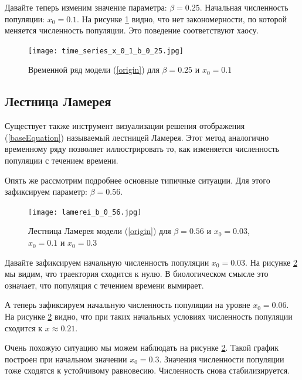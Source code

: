         Давайте теперь изменим значение параметра: \(\beta = 0.25\). Начальная численность популяции: \(x_0 = 0.1\). На рисунке \ref{time_series_x_0_1_b_0_25} видно, что нет закономерности, по которой меняется численность популяции. Это поведение соответствуют хаосу.
    
        \begin{figure}
            \centering
            \texttt{[image: time\_series\_x\_0\_1\_b\_0\_25.jpg]}

            \captionsetup{justification=centering}
            \caption{Временной ряд модели (\ref{origin}) для \(\beta = 0.25\) и \(x_0 = 0.1\)}
            \label{time_series_x_0_1_b_0_25}
        \end{figure}

    \subsection{Лестница Ламерея}
    
        Существует также инструмент визуализации решения отображения (\ref{baseEquation}) называемый лестницей Ламерея. Этот метод аналогично временному ряду позволяет иллюстрировать то, как изменяется численность популяции с течением времени.
            
        Опять же рассмотрим подробнее основные типичные ситуации. Для этого зафиксируем параметр: \(\beta = 0.56\). 
    
        \begin{figure}
            \centering
            \texttt{[image: lamerei\_b\_0\_56.jpg]}
    
            \captionsetup{justification=centering}
            \caption{Лестница Ламерея модели (\ref{origin}) для \(\beta = 0.56\) и \(x_0 = 0.03\), \(x_0 = 0.1\) и \(x_0 = 0.3\)}
            \label{lamerei_b_0_56}
        \end{figure}
    
        Давайте зафиксируем начальную численность популяции \(x_0 = 0.03\). На рисунке \ref{lamerei_b_0_56} мы видим, что траектория сходится к нулю. В биологическом смысле это означает, что популяция с течением времени вымирает.
    
        А теперь зафиксируем начальную численность популяции на уровне \(x_0 = 0.06\). На рисунке \ref{lamerei_b_0_56} видно, что при таких начальных условиях численность популяции сходится к \(x \approx 0.21\).
            
        Очень похожую ситуацию мы можем наблюдать на рисунке \ref{lamerei_b_0_56}. Такой график построен при начальном значении \(x_0 = 0.3\). Значения численности популяции тоже сходятся к устойчивому равновесию. Численность снова стабилизируется.
            
